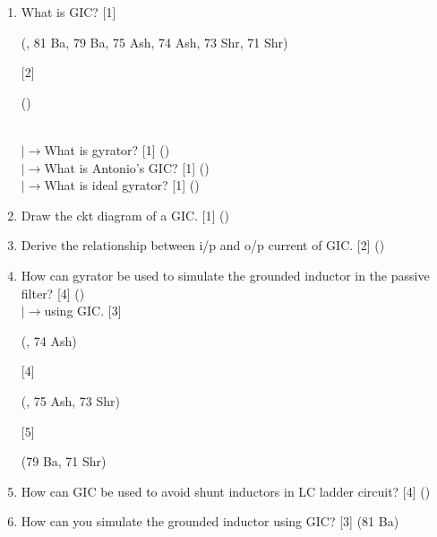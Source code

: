 \documentclass[12pt]{article}
\newcommand{\lb}{\\$\left|\rightarrow\right.$}
\begin{document}
			\begin{enumerate}[topsep=0pt]
				\item What is GIC? \hfill [1] \begin{footnotesize} (, 81 Ba, 79 Ba, 75 Ash, 74 Ash, 73 Shr, 71 Shr) \end{footnotesize} [2] \begin{footnotesize} () \end{footnotesize}				 
				\lb What is gyrator? \hfill [1] ()
				\lb What is Antonio's GIC? \hfill [1] ()
				\lb What is ideal gyrator? \hfill [1] ()

				\item Draw the ckt diagram of a GIC. \hfill [1] ()

				\item Derive the relationship between i/p and o/p current of GIC. \hfill [2] ()

				\item How can gyrator be used to simulate the grounded inductor in the passive filter? \hfill [4] ()
				\lb using GIC. \hfill [3] \begin{footnotesize} (, 74 Ash) \end{footnotesize} [4] \begin{footnotesize} (, 75 Ash, 73 Shr) \end{footnotesize} [5] \begin{footnotesize} (79 Ba, 71 Shr) \end{footnotesize}

				\item How can GIC be used to avoid shunt inductors in LC ladder circuit? \hfill [4] ()
				
				\item How can you simulate the grounded inductor using GIC? \hfill [3] (81 Ba)
				

\end{enumerate}
\end{document}

